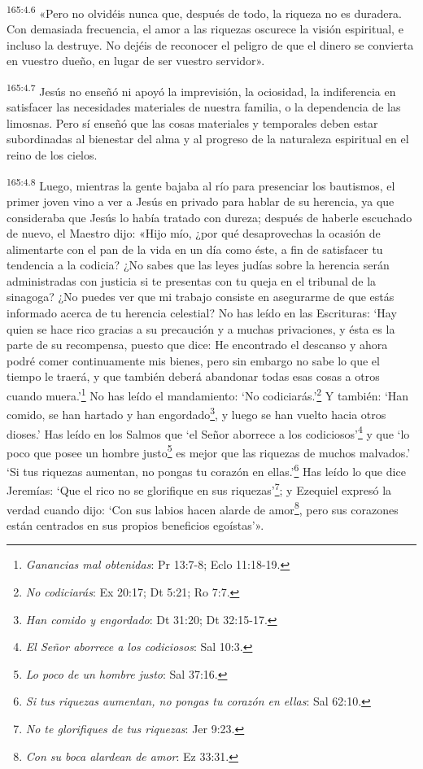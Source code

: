 \par
\textsuperscript{165:4.6} «Pero no olvidéis nunca que, después de todo, la riqueza no es duradera. Con demasiada frecuencia, el amor a las riquezas oscurece la visión espiritual, e incluso la destruye. No dejéis de reconocer el peligro de que el dinero se convierta en vuestro dueño, en lugar de ser vuestro servidor».

\par
\textsuperscript{165:4.7} Jesús no enseñó ni apoyó la imprevisión, la ociosidad, la indiferencia en satisfacer las necesidades materiales de nuestra familia, o la dependencia de las limosnas. Pero sí enseñó que las cosas materiales y temporales deben estar subordinadas al bienestar del alma y al progreso de la naturaleza espiritual en el reino de los cielos.

\par
\textsuperscript{165:4.8} Luego, mientras la gente bajaba al río para presenciar los bautismos, el primer joven vino a ver a Jesús en privado para hablar de su herencia, ya que consideraba que Jesús lo había tratado con dureza; después de haberle escuchado de nuevo, el Maestro dijo: «Hijo mío, ¿por qué desaprovechas la ocasión de alimentarte con el pan de la vida en un día como éste, a fin de satisfacer tu tendencia a la codicia? ¿No sabes que las leyes judías sobre la herencia serán administradas con justicia si te presentas con tu queja en el tribunal de la sinagoga? ¿No puedes ver que mi trabajo consiste en asegurarme de que estás informado acerca de tu herencia celestial? No has leído en las Escrituras: `Hay quien se hace rico gracias a su precaución y a muchas privaciones, y ésta es la parte de su recompensa, puesto que dice: He encontrado el descanso y ahora podré comer continuamente mis bienes, pero sin embargo no sabe lo que el tiempo le traerá, y que también deberá abandonar todas esas cosas a otros cuando muera.'\footnote{\textit{Ganancias mal obtenidas}: Pr 13:7-8; Eclo 11:18-19.} No has leído el mandamiento: `No codiciarás.'\footnote{\textit{No codiciarás}: Ex 20:17; Dt 5:21; Ro 7:7.} Y también: `Han comido, se han hartado y han engordado\footnote{\textit{Han comido y engordado}: Dt 31:20; Dt 32:15-17.}, y luego se han vuelto hacia otros dioses.' Has leído en los Salmos que `el Señor aborrece a los codiciosos'\footnote{\textit{El Señor aborrece a los codiciosos}: Sal 10:3.} y que `lo poco que posee un hombre justo\footnote{\textit{Lo poco de un hombre justo}: Sal 37:16.} es mejor que las riquezas de muchos malvados.' `Si tus riquezas aumentan, no pongas tu corazón en ellas.'\footnote{\textit{Si tus riquezas aumentan, no pongas tu corazón en ellas}: Sal 62:10.} Has leído lo que dice Jeremías: `Que el rico no se glorifique en sus riquezas'\footnote{\textit{No te glorifiques de tus riquezas}: Jer 9:23.}; y Ezequiel expresó la verdad cuando dijo: `Con sus labios hacen alarde de amor\footnote{\textit{Con su boca alardean de amor}: Ez 33:31.}, pero sus corazones están centrados en sus propios beneficios egoístas'».

